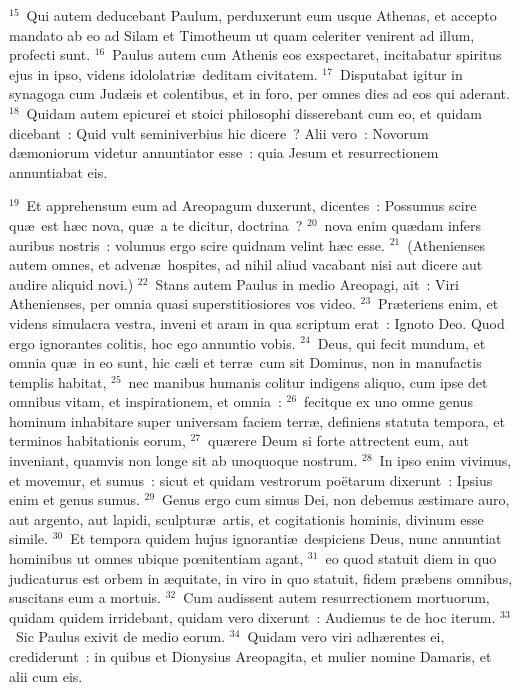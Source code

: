 ${}^{15}$~Qui autem deducebant Paulum, perduxerunt eum usque Athenas, et accepto mandato ab eo ad Silam et Timotheum ut quam celeriter venirent ad illum, profecti sunt.
${}^{16}$~Paulus autem cum Athenis eos exspectaret, incitabatur spiritus ejus in ipso, videns idololatri\ae\ deditam civitatem.
${}^{17}$~Disputabat igitur in synagoga cum Jud\ae is et colentibus, et in foro, per omnes dies ad eos qui aderant.
${}^{18}$~Quidam autem epicurei et stoici philosophi disserebant cum eo, et quidam dicebant~: Quid vult seminiverbius hic dicere~? Alii vero~: Novorum d\ae moniorum videtur annuntiator esse~: quia Jesum et resurrectionem annuntiabat eis.


${}^{19}$~Et apprehensum eum ad Areopagum duxerunt, dicentes~: Possumus scire qu\ae\ est h\ae c nova, qu\ae\ a te dicitur, doctrina~?
${}^{20}$~nova enim qu\ae dam infers auribus nostris~: volumus ergo scire quidnam velint h\ae c esse.
${}^{21}$~(Athenienses autem omnes, et adven\ae\ hospites, ad nihil aliud vacabant nisi aut dicere aut audire aliquid novi.)
${}^{22}$~Stans autem Paulus in medio Areopagi, ait~: Viri Athenienses, per omnia quasi superstitiosiores vos video.
${}^{23}$~Pr\ae teriens enim, et videns simulacra vestra, inveni et aram in qua scriptum erat~: Ignoto Deo. Quod ergo ignorantes colitis, hoc ego annuntio vobis.
${}^{24}$~Deus, qui fecit mundum, et omnia qu\ae\ in eo sunt, hic c\ae li et terr\ae\ cum sit Dominus, non in manufactis templis habitat,
${}^{25}$~nec manibus humanis colitur indigens aliquo, cum ipse det omnibus vitam, et inspirationem, et omnia~:
${}^{26}$~fecitque ex uno omne genus hominum inhabitare super universam faciem terr\ae , definiens statuta tempora, et terminos habitationis eorum,
${}^{27}$~qu\ae rere Deum si forte attrectent eum, aut inveniant, quamvis non longe sit ab unoquoque nostrum.
${}^{28}$~In ipso enim vivimus, et movemur, et sumus~: sicut et quidam vestrorum po\"etarum dixerunt~: Ipsius enim et genus sumus.
${}^{29}$~Genus ergo cum simus Dei, non debemus \ae stimare auro, aut argento, aut lapidi, sculptur\ae\ artis, et cogitationis hominis, divinum esse simile.
${}^{30}$~Et tempora quidem hujus ignoranti\ae\ despiciens Deus, nunc annuntiat hominibus ut omnes ubique pœnitentiam agant,
${}^{31}$~eo quod statuit diem in quo judicaturus est orbem in \ae quitate, in viro in quo statuit, fidem pr\ae bens omnibus, suscitans eum a mortuis.
${}^{32}$~Cum audissent autem resurrectionem mortuorum, quidam quidem irridebant, quidam vero dixerunt~: Audiemus te de hoc iterum.
${}^{33}$~Sic Paulus exivit de medio eorum.
${}^{34}$~Quidam vero viri adh\ae rentes ei, crediderunt~: in quibus et Dionysius Areopagita, et mulier nomine Damaris, et alii cum eis.

